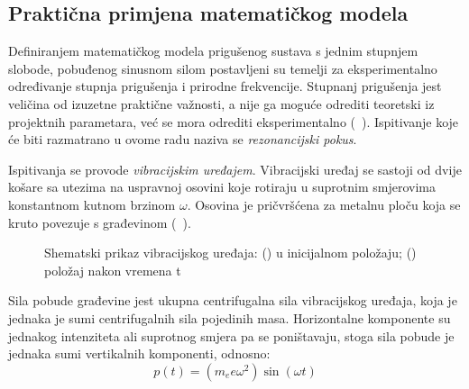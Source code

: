 \subsection{Praktična primjena matematičkog modela}\label{sec:prakticna}
Definiranjem matematičkog modela prigušenog sustava s jednim stupnjem slobode,
pobuđenog sinusnom silom postavljeni su temelji za eksperimentalno određivanje
stupnja prigušenja i prirodne frekvencije. Stupnanj prigušenja jest veličina od
izuzetne praktične važnosti, a nije ga moguće odrediti teoretski iz projektnih
parametara, već se mora odrediti eksperimentalno (~\cite{dk_skripta}). %
Ispitivanje koje će biti razmatrano u ovome radu naziva se \textit{rezonancijski
pokus}.


Ispitivanja se provode \textit{vibracijskim uređajem}. Vibracijski uređaj se sastoji
od dvije košare sa utezima na uspravnoj osovini koje rotiraju u suprotnim smjerovima
konstantnom kutnom brzinom $\omega$. Osovina je pričvršćena za metalnu ploču koja se
kruto povezuje s građevinom (~\cite{dk_skripta}). 

\begin{figure}[H]
        \begin{subfigure}[b][][l]{0.45\textwidth}
        
        \caption{}
        \label{fig:vibracijski-t0}
    \end{subfigure}
    \hfill
    \begin{subfigure}[b][][r]{0.45\textwidth}
        
        \caption{}
        \label{fig:vibracijski-t}
    \end{subfigure}
    \caption{Shematski prikaz vibracijskog uređaja: 
            () u inicijalnom položaju;
            () položaj nakon vremena t}
    \label{fig:vibracijski}
\end{figure}

Sila pobude građevine jest ukupna centrifugalna sila vibracijskog uređaja, koja je 
jednaka je sumi centrifugalnih sila pojedinih masa.
Horizontalne komponente su jednakog intenziteta ali suprotnog smjera pa se
poništavaju, stoga sila pobude je jednaka sumi vertikalnih komponenti, odnosno:
\begin{equation}
    p(t)=(m_ee\omega^2)\sin(\omega t)
\end{equation}

